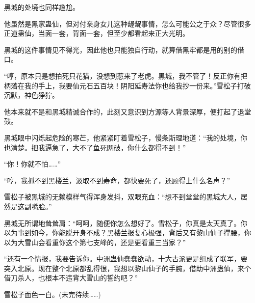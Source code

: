 \begin{this_body}
黑城的处境也同样尴尬。

他虽然是黑家蛊仙，但对付亲身女儿这种龌龊事情，怎么可能公之于众？尽管很多正道蛊仙，当面一套，背面一套，但至少都看起来正大光明。

黑城的这件事情见不得光，因此他也只能独自行动，就算借黑牢都是用的别的借口。

“哼，原本只是想拍死只花猫，没想到惹来了老虎。黑城，我不管了！反正你有把柄落在我的手上，我要仙元石五百块！阴阳延寿法你也给我抄一份来。”雪松子打破沉默，神色狰狞。

他本来就不是和黑城精诚合作的，此刻又意识到方源等人背景深厚，便打起了退堂鼓。

黑城眼中闪烁起危险的寒芒，他紧紧盯着雪松子，慢条斯理地道：“我的处境，你也清楚。把我逼急了，大不了鱼死网破，你什么都得不到！”

“你！你就不怕……”

“哼，我抓不到黑楼兰，汲取不到寿命，都快要死了，还顾得上什么名声？”

雪松子被黑城的无赖模样气得浑身发抖，双眼充血：“想不到堂堂的黑城大人，居然是这副嘴脸。”

黑城无所谓地耸耸肩：“呵呵，随便你怎么想好了。雪松子，你真是太天真了。你以为事到如今，你能脱开身不成？黑楼兰报复心极强，背后又有黎山仙子撑腰，你以为大雪山会看重你这个第七支峰的，还是更看重三当家？”

“还有一个情报，我要告诉你。中洲蛊仙蠢蠢欲动，十大古派更是组成了联军，要突入北原。现在整个北原都乱得很，我想以黎山仙子的手腕，借助中洲蛊仙，来个借刀杀人，也根本不违背大雪山的誓约吧？”

雪松子面色一白。(未完待续……)

\end{this_body}

